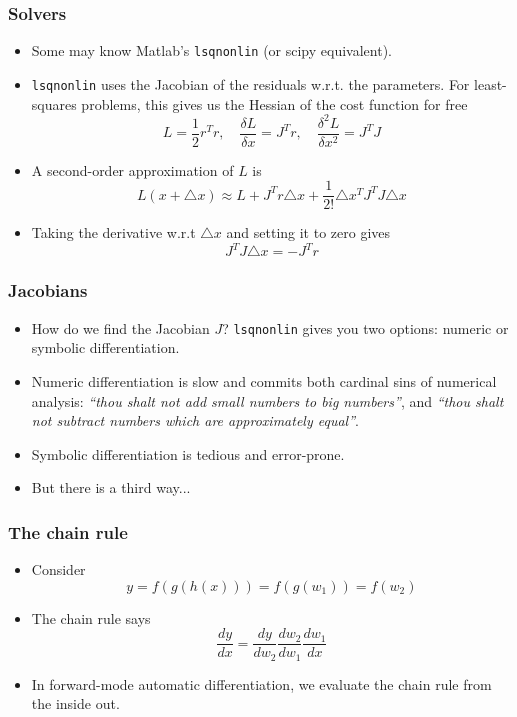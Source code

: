 \documentclass[serif,mathserif]{beamer}
\begin{document}
\begin{frame}
  \frametitle{Solvers}
  \begin{itemize}
  \item Some may know Matlab's \texttt{lsqnonlin} (or scipy equivalent). \pause
  \item \texttt{lsqnonlin} uses the Jacobian of the residuals w.r.t. the parameters.
  For least-squares problems, this gives us the Hessian of the cost function for free
  \[
  L = \frac{1}{2} r^T r, \quad
  \frac{\delta L}{\delta x} = J^T r, \quad
  \frac{\delta^2 L}{\delta x^2} = J^T J
  \] \pause
  \item A second-order approximation of $L$ is
  \[  L(x + \triangle x) \approx L + J^T r \triangle x  + \frac{1}{2!}\triangle x^T J^T J \triangle x  \] \pause
  \item Taking the derivative w.r.t $\triangle x$ and setting it to zero gives
  \[ J^T J \triangle x = - J^T r \]
  \end{itemize}
\end{frame}

\begin{frame}
  \frametitle{Jacobians}
  \begin{itemize}
  \item How do we find the Jacobian $J$? \texttt{lsqnonlin} gives you two options: numeric or symbolic differentiation. \pause
  \item Numeric differentiation is slow and commits both cardinal sins of numerical analysis:
  \emph{``thou shalt not add small numbers to big numbers''}, and 
  \emph{``thou shalt not subtract numbers which are approximately equal''}. \pause
  \item Symbolic differentiation is tedious and error-prone. \pause
  \item But there is a third way...
  \end{itemize}
\end{frame}

\begin{frame}
  \frametitle{The chain rule}
  \begin{itemize} 
  \item Consider
  \[  y = f(g(h(x))) = f(g(w_1)) = f(w_2)  \] \pause
  \item The chain rule says
  \[  \frac{dy}{dx} = \frac{dy}{dw_2}\frac{dw_2}{dw_1}\frac{dw_1}{dx}  \] \pause
  \item In forward-mode automatic differentiation, we evaluate the chain rule from the inside out.
  \end{itemize}
\end{frame}
\end{document}

